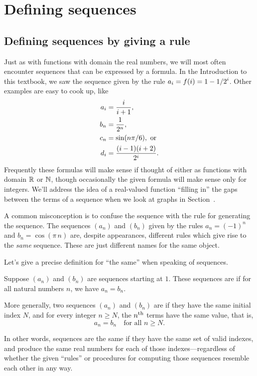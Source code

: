 \section{Defining sequences}
\label{section:defining-sequences}

\subsection{Defining sequences by giving a rule}

Just as with functions with domain the real numbers, we will most
often encounter sequences that can be expressed by a formula.  In the
Introduction to this textbook, we saw the sequence given by the rule $\displaystyle
a_i=f(i)=1-1/2^i$.  Other examples are easy to cook up, like
\begin{align*}
  a_i &={i\over i+1}, \\
  b_n &={1\over2^n}, \\
  c_n &=\sin(n\pi/6), \mbox{ or} \\
  d_i &={(i-1)(i+2)\over2^i}. \\
\end{align*}
Frequently these formulas will make sense if thought of either as
functions with domain $\mathbb{R}$ or $\mathbb{N}$, though occasionally the given
formula will make sense only for integers.  We'll address the
idea of a real-valued function ``filling in'' the gaps between the
terms of a sequence when we look at graphs in
Section~.

\begin{warning}
  A common misconception is to confuse the sequence with the rule for
  generating the sequence.  The sequences $(a_n)$ and $(b_n)$ given by
  the rules $a_n = (-1)^n$ and $b_n = \cos (\pi \, n)$ are, despite
  appearances, different rules which give rise to the \textit{same}
  sequence.  These are just different names for the same object.
\end{warning}

Let's give a precise definition for ``the same'' when speaking of sequences.


\begin{definition}
  Suppose $(a_n)$ and $(b_n)$ are sequences starting at $1$.  These
  sequences are  if for all
  natural numbers $n$, we have $a_n = b_n$.

  More generally, two sequences $(a_n)$ and $(b_n)$ are
   if they have the same initial index $N$, and for
  every integer $n \geq N$, the $n^{\mbox{\scriptsize th}}$ terms have the same value, that is,
  \[
  a_n = b_n \quad \mbox{for all $n \geq N$.}
  \]
\end{definition}
In other words, sequences are the same if they have the same set of
valid indexes, and produce the same real numbers for each of those
indexes---regardless of whether the given ``rules'' or procedures for
computing those sequences resemble each other in any way.

